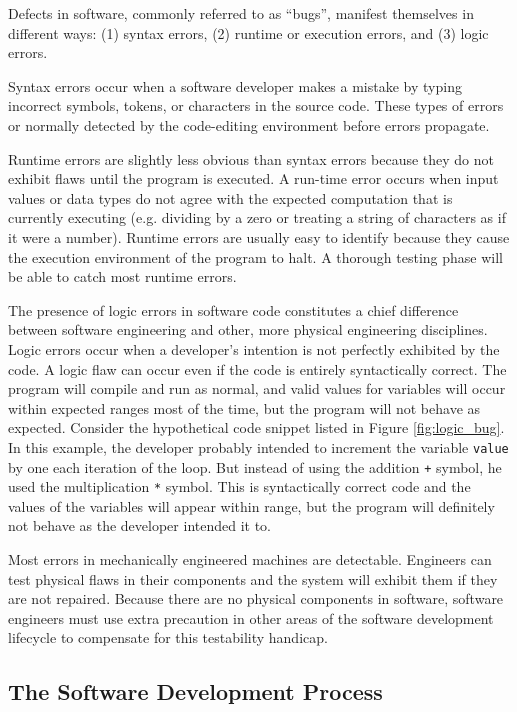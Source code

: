 Defects in software, commonly referred to as ``bugs'', manifest themselves in
different ways: (1) syntax errors, (2) runtime or execution errors, and (3)
logic errors.

Syntax errors occur when a software developer makes a mistake by 
typing incorrect symbols, tokens, or characters in the source code. These types
of errors or normally detected by the code-editing environment before errors
propagate.

Runtime errors are slightly less obvious than syntax errors because they do not 
exhibit flaws until the program is executed. A run-time error occurs when input
values or data types do not agree with the expected computation that is
currently executing (e.g. dividing by a zero or treating a string of characters
as if it were a number). Runtime errors are usually easy to identify because
they cause the execution environment of the program to halt. A thorough testing
phase will be able to catch most runtime errors.

The presence of logic errors in software code constitutes a chief difference
between software engineering and other, more physical engineering disciplines.
Logic errors occur when a developer's intention is not perfectly exhibited by
the code. A logic flaw can occur even if the code is entirely syntactically
correct. The program will compile and run as normal, and valid values for
variables will occur within expected ranges most of the time, but the program
will not behave as expected. Consider the hypothetical code snippet listed in
Figure \ref{fig:logic_bug}. In this example, the developer probably intended to
increment the variable \verb!value! by one each iteration of the loop. But
instead of using the addition \verb!+! symbol, he used the multiplication
\verb!*! symbol. This is syntactically correct code and the values of the
variables will appear within range, but the program will definitely not behave
as the developer intended it to.

Most errors in mechanically engineered machines are detectable. Engineers can
test physical flaws in their components and the system will exhibit them if they
are not repaired. Because there are no physical components in software,
software engineers must use extra precaution in other areas of the software
development lifecycle to compensate for this testability handicap.

\subsection{The Software Development Process}

